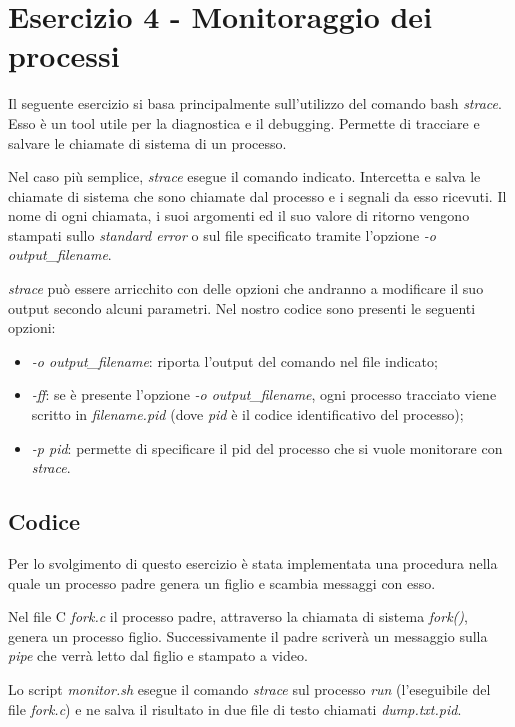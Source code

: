 \documentclass[a4paper, 12pt]{article}
\begin{document}
	\newpage
	\section*{Esercizio 4 - Monitoraggio dei processi}
	Il seguente esercizio si basa principalmente sull'utilizzo del comando bash \textit{strace}. Esso è un tool utile per la diagnostica e il debugging. Permette di tracciare e salvare le chiamate di sistema di un processo.
	
	Nel caso più semplice, \textit{strace} esegue il comando indicato. Intercetta e salva le chiamate di sistema che sono chiamate dal processo e i segnali da esso ricevuti. Il nome di ogni chiamata, i suoi argomenti ed il suo valore di ritorno vengono stampati sullo \textit{standard error} o sul file specificato tramite l'opzione \textit{-o output\_filename}.
	
	\textit{strace} può essere arricchito con delle opzioni che andranno a modificare il suo output secondo alcuni parametri. Nel nostro codice sono presenti le seguenti opzioni:
	\begin{itemize}
		\item \textit{-o output\_filename}: riporta l'output del comando nel file indicato;
		\item \textit{-ff}: se è presente l'opzione \textit{-o output\_filename}, ogni processo tracciato viene scritto in \textit{filename.pid} (dove \textit{pid} è il codice identificativo del processo);
		\item \textit{-p pid}: permette di specificare il pid del processo che si vuole monitorare con \textit{strace}.		
	\end{itemize}
	
	\subsection*{Codice}
	Per lo svolgimento di questo esercizio è stata implementata una procedura nella quale un processo padre genera un figlio e scambia messaggi con esso.
	
	Nel file C \textit{fork.c} il processo padre, attraverso la chiamata di sistema \textit{fork()}, genera un processo figlio. Successivamente il padre scriverà un messaggio sulla \textit{pipe} che verrà letto dal figlio e stampato a video.
	
	Lo script \textit{monitor.sh} esegue il comando \textit{strace} sul processo \textit{run} (l'eseguibile del file \textit{fork.c}) e ne salva il risultato in due file di testo chiamati \textit{dump.txt.pid}.
	
\end{document}
